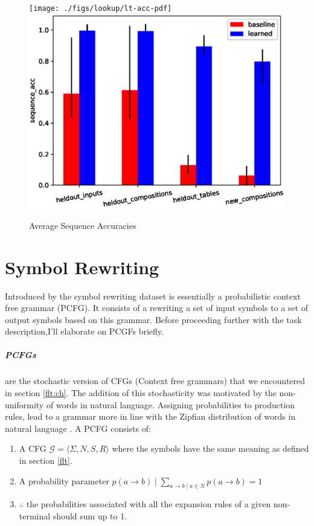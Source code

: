 \begin{figure}
	\begin{minipage}[t]{\textwidth}
		\ifpdf
		\texttt{[image: ./figs/lookup/lt-acc-pdf]}
		\else
		\includegraphics[width=\linewidth,keepaspectratio=true]{./figs/lookup/lt-acc-eps}
		\fi
		\caption{\small Average Sequence Accuracies}
		\label{res:lt-acc}
	\end{minipage}
\end{figure}


\section{Symbol Rewriting} \label{datasets:sr}
Introduced by \cite{Weber2018} the symbol rewriting dataset is essentially a probabilistic context free grammar (PCFG). It consists of a rewriting a set of input symbols to a set of output symbols based on this grammar. Before proceeding further with the task description,I'll elaborate on PCGFs briefly.

\subparagraph{PCFGs} are the stochastic version of CFGs (Context free grammars) that we encountered in section \ref{flt:ch}. The addition of this stochasticity was motivated by the non-uniformity of words in natural language. Assigning probabilities to production rules, lead to a grammar more in line with the Zipfian distribution of words in natural language \citep{jurafsky2014speech}. A PCFG consists of:

\begin{enumerate}
	\item A CFG $\mathcal{G} = \langle \Sigma, N, S, R \rangle$ where the symbols have the same meaning as defined in section \ref{flt}.
	\item A probability parameter $p(a \rightarrow b) \mid \displaystyle \sum_{a \rightarrow b \mid a \in N} p(a \rightarrow b) = 1 $ 
	\item $\therefore$ the probabilities associated with all the expansion rules of a given non-terminal should sum up to 1.
\end{enumerate}

